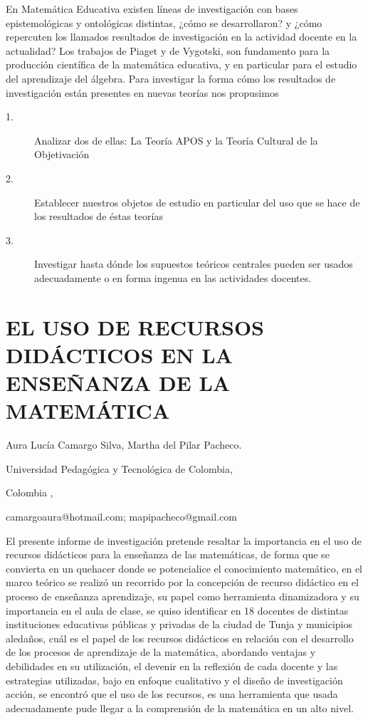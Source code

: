 En Matemática Educativa existen líneas de investigación con bases
epistemológicas y ontológicas distintas, ¿cómo se desarrollaron? y
¿cómo repercuten los llamados resultados de investigación en la actividad
docente en la actualidad? Los trabajos de Piaget y de Vygotski, son
fundamento para la producción científica de la matemática educativa,
y en particular para el estudio del aprendizaje del álgebra. Para
investigar la forma cómo los resultados de investigación están presentes
en nuevas teorías nos propusimos 
\begin{description}
\item [{1.}] Analizar dos de ellas: La Teoría APOS y la Teoría Cultural
de la Objetivación 
\item [{2.}] Establecer nuestros objetos de estudio en particular del uso
que se hace de los resultados de éstas teorías
\item [{3.}] Investigar hasta dónde los supuestos teóricos centrales pueden
ser usados adecuadamente o en forma ingenua en las actividades docentes.
\end{description}

\section{EL USO DE RECURSOS DIDÁCTICOS EN LA ENSEÑANZA DE LA MATEMÁTICA }

\begin{datos}

Aura Lucía Camargo Silva, Martha del Pilar Pacheco.

Universidad Pedagógica y Tecnológica de Colombia,

Colombia ,

camargoaura@hotmail.com; mapipacheco@gmail.com 

\end{datos}

El presente informe de investigación pretende resaltar la importancia
en el uso de recursos didácticos para la enseñanza de las matemáticas,
de forma que se convierta en un quehacer donde se potencialice el
conocimiento matemático, en el marco teórico se realizó un recorrido
por la concepción de recurso didáctico en el proceso de enseñanza
aprendizaje, su papel como herramienta dinamizadora y su importancia
en el aula de clase, se quiso identificar en 18 docentes de distintas
instituciones educativas públicas y privadas de la ciudad de Tunja
y municipios aledaños, cuál es el papel de los recursos didácticos
en relación con el desarrollo de los procesos de aprendizaje de la
matemática, abordando ventajas y debilidades en su utilización, el
devenir en la reflexión de cada docente y las estrategias utilizadas,
bajo en enfoque cualitativo y el diseño de investigación acción, se
encontró que el uso de los recursos, es una herramienta que usada
adecuadamente pude llegar a la comprensión de la matemática en un
alto nivel.



